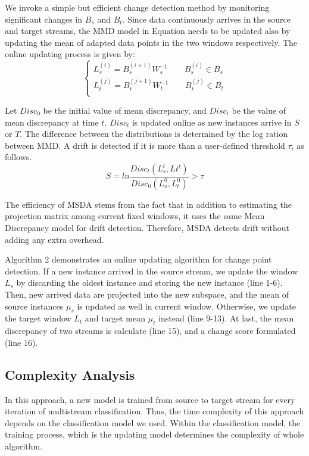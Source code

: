 We invoke a simple but efficient change detection method by monitoring significant changes in $B_s$ and $B_t$. Since data continuously arrives in the source and target streams, the MMD model in Equation needs to be updated also by updating the mean of adapted data points in the two windows respectively. The online updating process is given by:
\begin{equation}
\begin{cases}
L_s^{(i)}=B_s^{(i+1)}W_s^{-1} \qquad B_s^{(i)}\in B_s \\
L_t^{(j)}=B_t^{(j+1)}W_t^{-1} \qquad {B}_t^{(j)}\in {B}_t\\
\end{cases}
\end{equation}

Let $Disc_0$ be the initial value of mean discrepancy, and $Disc_t$ be the value of mean discrepancy at time $t$. $Disc_t$ is updated online as new instances arrive in $S$ or $T$. The difference between the distributions is determined by the log ration between MMD.
A drift is detected if it is more than a user-defined threshold $\tau$, as follows.
\begin{equation}
S = ln\frac{Disc_t(L_{s}^t,L{t}^t)}{Disc_0(L_{s}^0,L_{t}^0)}>\tau
\end{equation}

The efficiency of MSDA stems from the fact that in addition to estimating the projection matrix among current fixed windows, it uses the same Mean Discrepancy model for drift detection. Therefore, MSDA detects drift without adding any extra overhead.

Algorithm 2 demonstrates an online updating algorithm for change point detection. If a new instance arrived in the source stream, we update the window $L_s$ by discarding the oldest instance and storing the new instance (line 1-6). Then, new arrived data are projected into the new subspace, and the mean of source instances $\mu_s$ is updated as well in current window. Otherwise, we update the target window $L_t$ and target mean $\mu_t$ instead (line 9-13). At last, the mean discrepancy of two streams is calculate (line 15), and a change score formulated (line 16).

\subsection{Complexity Analysis}
In this approach, a new model is trained from source to target stream for every iteration of multistream classification. Thus, the time complexity of this approach depends on the classification model we used. Within the classification model, the training process, which is the updating model determines the complexity of whole algorithm.

